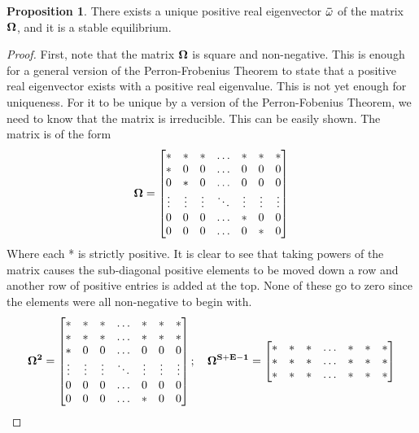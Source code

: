 \documentclass[12pt]{report}
\theoremstyle{definition}
\newtheorem{proposition}{Proposition} %
\begin{document}
  \begin{proposition}
    There exists a unique positive real eigenvector $\bf\bar\omega$ of the matrix $\bf\Omega$, and it is a stable equilibrium.
  \end{proposition}

  \begin{proof}
    First, note that the matrix $\bf\Omega$ is square and non-negative.  This is enough for a general version of the Perron-Frobenius Theorem to state that a positive real eigenvector exists with a positive real eigenvalue.  This is not yet enough for uniqueness.  For it to be unique by a version of the Perron-Fobenius Theorem, we need to know that the matrix is irreducible.  This can be easily shown.  The matrix is of the form
    $$\bf\Omega =
    \begin{bmatrix}
    	* & *  & * & \hdots & * & * & *\\
    	* & 0 & 0 & \hdots & 0 & 0 & 0 \\
    	0 & * & 0 & \hdots & 0 & 0 & 0 \\
    	\vdots & \vdots & \vdots & \ddots & \vdots & \vdots & \vdots \\
    	0 & 0 & 0 & \hdots & *  & 0 & 0 \\
    	0 & 0 & 0 & \hdots & 0 & * & 0
    \end{bmatrix}
    $$
    Where each * is strictly positive.  It is clear to see that taking powers of the matrix causes the sub-diagonal positive elements to be moved down a row and another row of positive entries is added at the top.  None of these go to zero since the elements were all non-negative to begin with.
    $$\bf\Omega^2 =
    \begin{bmatrix}
    	* & *  & * & \hdots & * & * & *\\
    	* & * & * & \hdots & * & * & * \\
    	* & 0 & 0 & \hdots & 0 & 0 & 0 \\
    	\vdots & \vdots & \vdots & \ddots & \vdots & \vdots & \vdots \\
    	0 & 0 & 0 & \hdots & 0  & 0 & 0 \\
    	0 & 0 & 0 & \hdots & * & 0 & 0
    \end{bmatrix}; ~~~
    \bf\Omega^{S+E-1} =
    \begin{bmatrix}
    	* & *  & * & \hdots & * & * & *\\
    	* & * & * & \hdots & * & * & * \\
    	* & * & * & \hdots & * & * & * \\

\end{bmatrix}$$
\end{proof}
\end{document}
